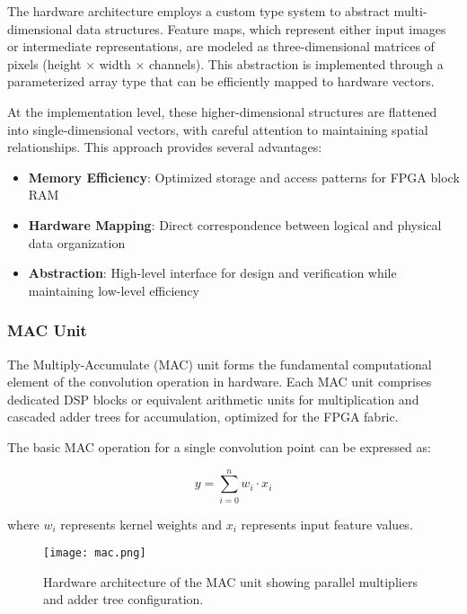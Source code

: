 The hardware architecture employs a custom type system to abstract multi-dimensional data structures. Feature maps, which represent either input images or intermediate representations, are modeled as three-dimensional matrices of pixels (height × width × channels). This abstraction is implemented through a parameterized array type that can be efficiently mapped to hardware vectors.

At the implementation level, these higher-dimensional structures are flattened into single-dimensional vectors, with careful attention to maintaining spatial relationships. This approach provides several advantages:

\begin{itemize}
    \item \textbf{Memory Efficiency}: Optimized storage and access patterns for FPGA block RAM
    \item \textbf{Hardware Mapping}: Direct correspondence between logical and physical data organization
    \item \textbf{Abstraction}: High-level interface for design and verification while maintaining low-level efficiency
\end{itemize}

\subsubsection{MAC Unit}

The Multiply-Accumulate (MAC) unit forms the fundamental computational element of the convolution operation in hardware. Each MAC unit comprises dedicated DSP blocks or equivalent arithmetic units for multiplication and cascaded adder trees for accumulation, optimized for the FPGA fabric.

The basic MAC operation for a single convolution point can be expressed as:

\begin{equation}
    y = \sum_{i=0}^{n} w_i \cdot x_i
\end{equation}

where $w_i$ represents kernel weights and $x_i$ represents input feature values.

\begin{figure}[h]
    \centering
    \texttt{[image: mac.png]}
    \caption{Hardware architecture of the MAC unit showing parallel multipliers and adder tree configuration.}
    \label{fig:mac}
\end{figure}

